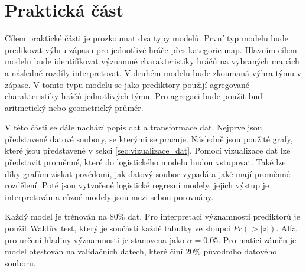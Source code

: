 \chapter{Praktická část}
{\color{red}
Cílem praktické části je prozkoumat dva typy modelů. První typ modelu bude predikovat výhru zápasu pro jednotlivé hráče přes kategorie map. Hlavním cílem 
modelu bude identifikovat významné charakteristiky hráčů na vybraných mapách a následně rozdíly interpretovat. V druhém modelu bude zkoumaná výhra týmu v zápase.
V tomto typu modelu se jako prediktory použijí agregované charakteristiky hráčů jednotlivých týmu. Pro agregaci bude použit buď aritmetický nebo geometrický průměr. 

V této části se dále nachází popis dat a transformace dat. Nejprve jsou představené datové soubory,
se kterými se pracuje. Následně jsou použité grafy, které jsou představené v sekci \ref{sec:vizualizace_dat}. Pomocí vizualizace dat lze představit proměnné, které
do logistického modelu budou vstupovat. Také lze díky grafům získat povědomí, jak datový soubor vypadá a jaké mají proměnné rozdělení.
Poté jsou vytvořené logistické regresní modely, jejich výstup je interpretován a různé modely jsou mezi sebou porovnány.

Každý model je trénován na 80\% dat. Pro interpretaci významnosti prediktorů je použit Waldův test, který je součástí každé tabulky
ve sloupci $Pr(>|z|)$. Alfa pro určení hladiny významnosti je stanovena jako $\alpha = 0.05$. Pro matici záměn je model otestován na validačních datech, 
které činí 20\% původního datového souboru.
}

